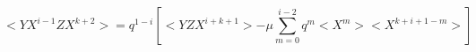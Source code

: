 \begin{equation}
<Y X^{i-1} Z X^{k+2}> = q^{1-i}
\left[<YZ X^{i+k+1}>-
\mu \sum_{m=0}^{i-2} q^m <X^m><X^{k+i+1-m}>\right]
\end{equation}

